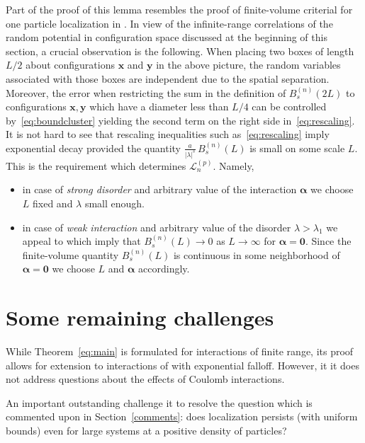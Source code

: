 \documentclass[reqno,keywordsasfootnote]{article}
\numberwithin{equation}{section}
\theoremstyle{definition}
\begin{document}
Part of the proof of this lemma resembles the proof of finite-volume criterial for one particle localization   in \cite{ASFH}. 
In view of the infinite-range correlations 
of the random potential in configuration space discussed at the beginning of this section, a crucial observation is the following. 
When placing two 
boxes of length $ L/2 $ about configurations $ {\mathbf{x}} $ and $ {\mathbf{y}} $ in the above picture, the random variables associated with those boxes are independent 
due to the spatial separation. 
Moreover, the error when restricting the sum in the definition of $ B^{(n)}_s(2L) $ to configurations $ {\mathbf{x}} , {\mathbf{y}} $ which have a diameter less than $ L/4 $ can be controlled by~\eqref{eq:boundcluster} yielding the second term on the right side in~\eqref{eq:rescaling}.\\

It is not hard to see that rescaling inequalities such as~\eqref{eq:rescaling} imply exponential decay provided the quantity $ \frac{a}{|\lambda|^{s} }\, B^{(n)}_s(L) $ is small on some scale $ L$. 
This is the requirement which determines $\mathcal{L}^{(p)}_{n} $. Namely, 
\begin{itemize}
\item in case of
 {\it strong disorder} and arbitrary value of the interaction $ {\boldsymbol{\alpha}} $ we choose $L$ fixed and $ \lambda $ small enough. 
 \item in case of {\it weak interaction} and arbitrary value of the disorder $ \lambda > \lambda_1 $ we appeal to \cite{AM,ASFH} which imply that
  $ B^{(n)}_s(L) \to 0 $ as $ L \to \infty $ for $ {\boldsymbol{\alpha}} = \mathbf{0} $. Since the finite-volume quantity $ B^{(n)}_s(L) $ is continuous in some neighborhood of $ {\boldsymbol{\alpha}} = \mathbf{0} $ we choose $ L $ and $ {\boldsymbol{\alpha}} $ accordingly. 
 \end{itemize}
 
 
\section{Some remaining challenges}
 
While Theorem~\ref{eq:main} is formulated for interactions of finite range, its proof allows for extension to interactions of with exponential falloff.  However, it it does not address  questions about the effects of Coulomb interactions. 

An important outstanding challenge it to resolve the question which is commented upon in Section~\ref{comments}: does  localization persists (with uniform bounds)  even for  large systems at  a positive density of particles?     
\end{document}
